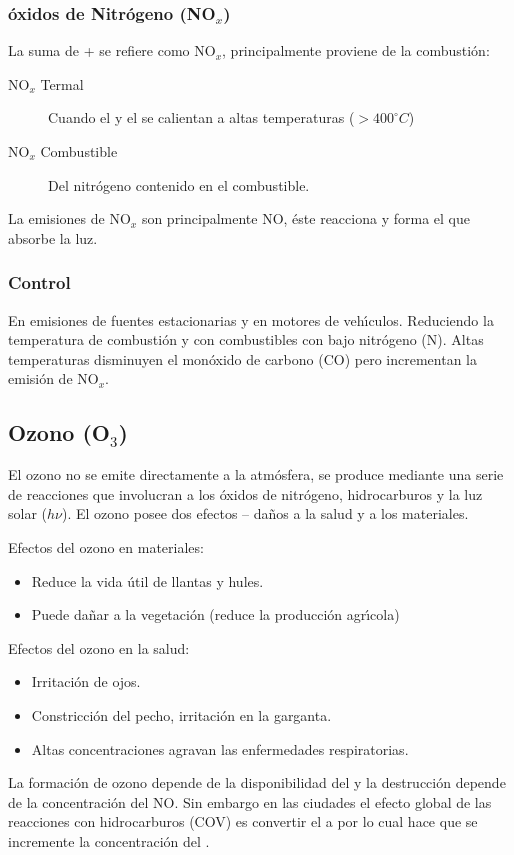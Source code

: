 \subsubsection{\'oxidos de Nitr\'ogeno (NO$_x$)}
La suma de  +  se refiere como NO$_x$, principalmente proviene de la combusti\'on:
\begin{description}
\item[NO$_x$ Termal] Cuando el   y el  se calientan a altas temperaturas
($>400^\circ C$)
\item[NO$_x$ Combustible] Del nitr\'ogeno contenido en el combustible.
\end{description}
La emisiones de NO$_x$ son principalmente NO, \'este reacciona y forma el  que absorbe la luz.

\subsubsection{Control} En emisiones de fuentes estacionarias y en motores de veh\'{\i}culos. Reduciendo la temperatura de combusti\'on y con combustibles con bajo nitr\'ogeno (N). Altas temperaturas disminuyen el mon\'oxido de carbono (CO) pero incrementan la emisi\'on de  NO$_x$.

\subsection{Ozono (O$_3$)}\label{o3_salud}
El ozono no se emite directamente a la atm\'osfera, se produce mediante una serie de reacciones que involucran a los \'oxidos de nitr\'ogeno, hidrocarburos y la luz solar ($h\nu$). El ozono posee dos efectos -- da\~nos a la salud y a los materiales.

Efectos del ozono en materiales:
\begin{itemize}
\item Reduce la vida \'util de llantas y hules.
\item Puede da\~nar a la vegetaci\'on (reduce la producci\'on agr\'{\i}cola)
\end{itemize}
Efectos del ozono en la salud:
\begin{itemize}
\item Irritaci\'on de ojos.
\item Constricci\'on del pecho, irritaci\'on en la garganta.
\item Altas concentraciones agravan las enfermedades respiratorias.
\end{itemize}
La  formaci\'on de ozono depende de la disponibilidad del   y la destrucci\'on depende de la concentraci\'on del NO. Sin embargo en las ciudades el efecto global de las reacciones con hidrocarburos (COV) es convertir el  a  por lo cual hace que se incremente la concentraci\'on del .

